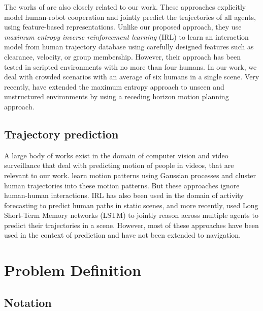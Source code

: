 %

The works of \cite{kuderer12, Kretzschmar16} are also closely related to our work. These approaches explicitly model human-robot cooperation and jointly predict the trajectories of all agents, using feature-based representations. 
Unlike our proposed approach, they use \textit{maximum entropy inverse reinforcement learning} (IRL) to learn an interaction model from human trajectory database using carefully designed features 
%
such as clearance, velocity, or group membership.
However, their approach has been tested in scripted environments with no more than four humans. In our work, we deal with crowded scenarios with an average of six humans in a single scene. Very recently, \cite{pfeiffer16} have extended the maximum entropy approach to unseen and unstructured environments by using a receding horizon motion planning approach.
%

\subsection{Trajectory prediction}
\label{sec:oigp-traj-pred}

A large body of works exist in the domain of computer vision and video surveillance that deal with predicting motion of people in videos, that are relevant to our work. \cite{kim11, joseph11} learn motion patterns using Gaussian processes and cluster human trajectories into these motion patterns. But these approaches ignore human-human interactions. IRL has also been used in the domain of activity forecasting to predict human paths in static scenes, \cite{kitani12} and more recently, \cite{alahi16} used Long Short-Term Memory networks (LSTM) to jointly reason across multiple agents to predict their trajectories in a scene. However, most of these approaches have been used in the context of prediction and have not been extended to navigation.

\section{Problem Definition}
\label{sec:oigp-problem-definition}

\subsection{Notation}
\label{sec:oigp-notation}

